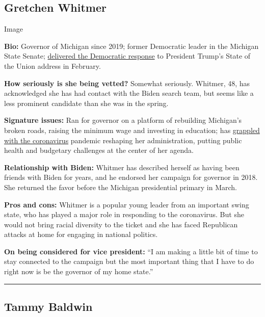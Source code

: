 \hypertarget{gretchen-whitmer}{%
\subsection{Gretchen Whitmer}\label{gretchen-whitmer}}

Image

\textbf{Bio:} Governor of Michigan since 2019; former Democratic leader
in the Michigan State Senate;
\href{https://www.nytimes.com/2020/02/04/us/politics/gretchen-whitmer-state-of-the-union.html}{delivered
the Democratic response} to President Trump's State of the Union address
in February.

\textbf{How seriously is she being vetted?} Somewhat seriously. Whitmer,
48, has acknowledged she has had contact with the Biden search team, but
seems like a less prominent candidate than she was in the spring.

\textbf{Signature issues:} Ran for governor on a platform of rebuilding
Michigan's broken roads, raising the minimum wage and investing in
education; has
\href{https://www.nytimes.com/2020/04/18/us/politics/gretchen-whitmer-michigan-protests.html}{grappled
with the coronavirus} pandemic reshaping her administration, putting
public health and budgetary challenges at the center of her agenda.

\textbf{Relationship with Biden:} Whitmer has described herself as
having been friends with Biden for years, and he endorsed her campaign
for governor in 2018. She returned the favor before the Michigan
presidential primary in March.

\textbf{Pros and cons:} Whitmer is a popular young leader from an
important swing state, who has played a major role in responding to the
coronavirus. But she would not bring racial diversity to the ticket and
she has faced Republican attacks at home for engaging in national
politics.

\textbf{On being considered for vice president:} ``I am making a little
bit of time to stay connected to the campaign but the most important
thing that I have to do right now is be the governor of my home state.''

\begin{center}\rule{0.5\linewidth}{\linethickness}\end{center}

\hypertarget{tammy-baldwin}{%
\subsection{Tammy Baldwin}\label{tammy-baldwin}}

